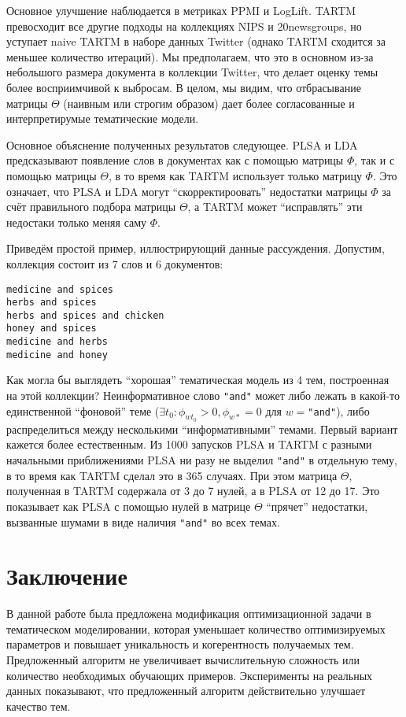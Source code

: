 Основное улучшение наблюдается в метриках PPMI и LogLift. TARTM превосходит все другие подходы на коллекциях NIPS и 20newsgroups, но уступает naive TARTM в наборе данных Twitter (однако TARTM сходится за меньшее количество итераций). Мы предполагаем, что это в основном из-за небольшого размера документа в коллекции Twitter, что делает оценку темы более восприимчивой к выбросам. В целом, мы видим, что отбрасывание матрицы $\Theta$ (наивным или строгим образом) дает более согласованные и интерпретирумые тематические модели.

Основное объяснение полученных результатов следующее. PLSA и LDA предсказывают появление слов в документах как с помощью матрицы $\Phi$, так и с помощью матрицы $\Theta$, в то время как TARTM использует только матрицу $\Phi$. Это означает, что PLSA и LDA могут ``скорректироовать'' недостатки матрицы $\Phi$ за счёт правильного подбора матрицы $\Theta$, а TARTM может ``исправлять'' эти недостаки только меняя саму $\Phi$.

Приведём простой пример, иллюстрирующий данные рассуждения. Допустим, коллекция состоит из 7 слов и 6 документов:
\begin{verbatim}
medicine and spices
herbs and spices
herbs and spices and chicken
honey and spices
medicine and herbs
medicine and honey 
\end{verbatim}

Как могла бы выглядеть ``хорошая'' тематическая модель из 4 тем, построенная на этой коллекции? Неинформативное слово \texttt{"and"} может либо лежать в какой-то единственной ``фоновой'' теме ($\exists t_0: \phi_{wt_0} > 0, \phi_{w\ast} = 0$ для $w=$\texttt{"and"}), либо распределиться между несколькими ``информативными'' темами. Первый вариант кажется более естественным. Из 1000 запусков PLSA и TARTM с разными начальными приближениями PLSA ни разу не выделил \texttt{"and"} в отдельную тему, в то время как TARTM сделал это в 365 случаях. При этом матрица $\Theta$, полученная в TARTM содержала от 3 до 7 нулей, а в PLSA от 12 до 17. Это показывает как PLSA с помощью нулей в матрице $\Theta$ ``прячет'' недостатки, вызванные шумами в виде наличия \texttt{"and"} во всех темах.

\section{Заключение}

В данной работе была предложена модификация оптимизационной задачи в тематическом моделировании, которая уменьшает количество оптимизируемых параметров и повышает уникальность и когерентность получаемых тем. Предложенный алгоритм не увеличивает вычислительную сложность или количество необходимых обучающих примеров. Эксперименты на реальных данных показывают, что предложенный алгоритм действительно улучшает качество тем.

